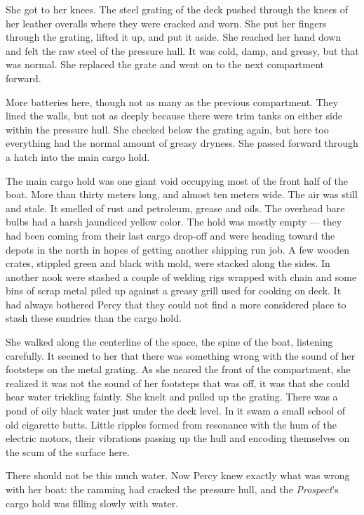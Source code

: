 \documentclass[
]{scrbook}
\begin{document}
She got to her knees. The steel grating of the deck pushed through the
knees of her leather overalls where they were cracked and worn. She put
her fingers through the grating, lifted it up, and put it aside. She
reached her hand down and felt the raw steel of the pressure hull. It
was cold, damp, and greasy, but that was normal. She replaced the grate
and went on to the next compartment forward.

More batteries here, though not as many as the previous compartment.
They lined the walls, but not as deeply because there were trim tanks on
either side within the pressure hull. She checked below the grating
again, but here too everything had the normal amount of greasy dryness.
She passed forward through a hatch into the main cargo hold.

The main cargo hold was one giant void occupying most of the front half
of the boat. More than thirty meters long, and almost ten meters wide.
The air was still and stale. It smelled of rust and petroleum, grease
and oils. The overhead bare bulbs had a harsh jaundiced yellow color.
The hold was mostly empty --- they had been coming from their last cargo
drop-off and were heading toward the depots in the north in hopes of
getting another shipping run job. A few wooden crates, stippled green
and black with mold, were stacked along the sides. In another nook were
stashed a couple of welding rigs wrapped with chain and some bins of
scrap metal piled up against a greasy grill used for cooking on deck. It
had always bothered Percy that they could not find a more considered
place to stash these sundries than the cargo hold.

She walked along the centerline of the space, the spine of the boat,
listening carefully. It seemed to her that there was something wrong
with the sound of her footsteps on the metal grating. As she neared the
front of the compartment, she realized it was not the sound of her
footsteps that was off, it was that she could hear water trickling
faintly. She knelt and pulled up the grating. There was a pond of oily
black water just under the deck level. In it swam a small school of old
cigarette butts. Little ripples formed from resonance with the hum of
the electric motors, their vibrations passing up the hull and encoding
themselves on the scum of the surface here.

There should not be this much water. Now Percy knew exactly what was
wrong with her boat: the ramming had cracked the pressure hull, and the
\emph{Prospect}'s cargo hold was filling slowly with water.
\end{document}
